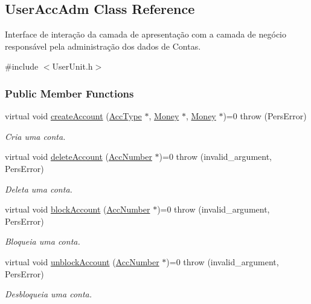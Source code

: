 \hypertarget{classUserAccAdm}{\subsection{User\-Acc\-Adm Class Reference}
\label{dd/d35/classUserAccAdm}
}


Interface de interação da camada de apresentação com a camada de negócio responsável pela administração dos dados de Contas.  




{\ttfamily \#include $<$User\-Unit.\-h$>$}

\subsubsection*{Public Member Functions}
\begin{DoxyCompactItemize}
\item 
virtual void \hyperlink{classUserAccAdm_a23b313ce179890606746ab3a279bd833}{create\-Account} (\hyperlink{classUsrType}{Acc\-Type} $\ast$, \hyperlink{classMoney}{Money} $\ast$, \hyperlink{classMoney}{Money} $\ast$)=0  throw (\-Pers\-Error)
\begin{DoxyCompactList}\small\item\em Cria uma conta. \end{DoxyCompactList}\item 
virtual void \hyperlink{classUserAccAdm_a8257788e5e7d125b7482e490a6d71550}{delete\-Account} (\hyperlink{classAccNumber}{Acc\-Number} $\ast$)=0  throw (invalid\-\_\-argument, Pers\-Error)
\begin{DoxyCompactList}\small\item\em Deleta uma conta. \end{DoxyCompactList}\item 
virtual void \hyperlink{classUserAccAdm_ad9cdd01395ad7dd1b2c0887fe12b71b8}{block\-Account} (\hyperlink{classAccNumber}{Acc\-Number} $\ast$)=0  throw (invalid\-\_\-argument, Pers\-Error)
\begin{DoxyCompactList}\small\item\em Bloqueia uma conta. \end{DoxyCompactList}\item 
virtual void \hyperlink{classUserAccAdm_ae179b3e21f336b325452eb3c0981b0d9}{unblock\-Account} (\hyperlink{classAccNumber}{Acc\-Number} $\ast$)=0  throw (invalid\-\_\-argument, Pers\-Error)
\begin{DoxyCompactList}\small\item\em Desbloqueia uma conta. \end{DoxyCompactList}\item 

\end{DoxyCompactItemize}

